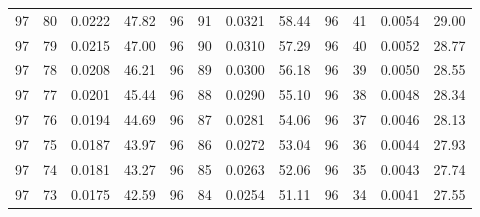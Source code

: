 \begin{tabular}{llll|llll|llll}
97 & 80 & 0.0222 & 47.82 & 96 & 91 & 0.0321 & 58.44 & 96 & 41 & 0.0054 & 29.00\\
97 & 79 & 0.0215 & 47.00 & 96 & 90 & 0.0310 & 57.29 & 96 & 40 & 0.0052 & 28.77\\
97 & 78 & 0.0208 & 46.21 & 96 & 89 & 0.0300 & 56.18 & 96 & 39 & 0.0050 & 28.55\\
97 & 77 & 0.0201 & 45.44 & 96 & 88 & 0.0290 & 55.10 & 96 & 38 & 0.0048 & 28.34\\
97 & 76 & 0.0194 & 44.69 & 96 & 87 & 0.0281 & 54.06 & 96 & 37 & 0.0046 & 28.13\\
97 & 75 & 0.0187 & 43.97 & 96 & 86 & 0.0272 & 53.04 & 96 & 36 & 0.0044 & 27.93\\
97 & 74 & 0.0181 & 43.27 & 96 & 85 & 0.0263 & 52.06 & 96 & 35 & 0.0043 & 27.74\\
97 & 73 & 0.0175 & 42.59 & 96 & 84 & 0.0254 & 51.11 & 96 & 34 & 0.0041 & 27.55\\
\bottomrule
\end{tabular}
\newpage
